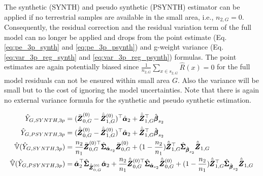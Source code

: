
The synthetic (SYNTH) and pseudo synthetic (PSYNTH) estimator can be applied if no terrestrial samples are available in the small area, i.e., $n_{2,G}=0$. Consequently, the residual correction and the residual variation term of the full model can no longer be applied and drops from the point estimate (Eq. \ref{eq:pe_3p_synth} and \ref{eq:pe_3p_psynth}) and g-weight variance (Eq. \ref{eq:var_3p_reg_synth} and \ref{eq:var_3p_reg_psynth}) formulas. The point estimates are again potentially biased since $\frac{1}{n_{2,G}}\sum_{x \in s_{2,G}}\hat{R}(x)=0$ for the full model residuals can not be ensured within small area $G$. Also the variance will be small but to the cost of ignoring the model uncertainties. Note that there is again no external variance formula for the synthetic and pseudo synthetic estimation.

\begin{subequations}\label{eq:3p_synth_psynth}
\begin{align}
\hat{Y}_{G,SYNTH,3p}&=(\bar{\pmb{Z}}^{(0)}_{0,G}-\hat{\bar{\pmb{Z}}}^{(0)}_{1,G})^{\top}\hat{\pmb{\alpha}}_2 +
\hat{\bar{\pmb{Z}}}^{\top}_{1,G}\hat{\pmb{\beta}}_{s_2} \label{eq:pe_3p_synth} \\
\hat{Y}_{G,PSYNTH,3p}&=(\hat{\bar{\pmb{Z}}}^{(0)}_{0,G}-\hat{\bar{\pmb{Z}}}^{(0)}_{1,G})^{\top}\hat{\pmb{\alpha}}_2 +
\hat{\bar{\pmb{Z}}}^{\top}_{1,G}\hat{\pmb{\beta}}_{s_2}\label{eq:pe_3p_psynth} \\
\hat{\mathbb{V}}(\hat{Y}_{G,SYNTH,3p})& =\frac{n_2}{n_1}\bar{\pmb{Z}}^{(0)\top}_{0,G}\hat{\pmb{\Sigma}}_{\hat{\pmb{\alpha}}_{s_2}}
\bar{\pmb{Z}}^{(0)}_{0,G}+(1-\frac{n_2}{n_1})\hat{\bar{\pmb{Z}}}_{1,G}^{\top}\hat{\pmb{\Sigma}}_{\hat{\pmb{\beta}}_{s_2}}
\hat{\bar{\pmb{Z}}}_{1,G} \label{eq:var_3p_reg_synth}\\
\hat{\mathbb{V}}(\hat{Y}_{G,PSYNTH,3p})& = \hat{\pmb{\alpha}}_2^{\top}\hat{\pmb{\Sigma}}_{\hat{\bar{\pmb{Z}}}^{(0)}_{0,G}}\hat{\pmb{\alpha}}_2 +
\frac{n_2}{n_1}\hat{\bar{\pmb{Z}}}^{(0)\top}_{0,G}\hat{\pmb{\Sigma}}_{\hat{\pmb{\alpha}}_{s_2}}
\hat{\bar{\pmb{Z}}}^{(0)}_{0,G}+(1-\frac{n_2}{n_1})\hat{\bar{\pmb{Z}}}_{1,G}^{\top}\hat{\pmb{\Sigma}}_{\hat{\pmb{\beta}}_{s_2}}
\hat{\bar{\pmb{Z}}}_{1,G} \label{eq:var_3p_reg_psynth}
\end{align}
\end{subequations}



